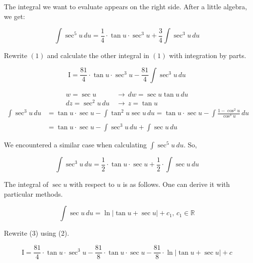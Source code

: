 \documentclass{article}
\begin{document}
\hfill

\noindent The integral we want to evaluate appears on the right side. After a little algebra, we get:

\begin{equation*}
\int\sec^5u \,du = \frac 14\cdot\tan u\cdot\sec^3 u + \frac 34\int\sec^3u\,du
\end{equation*}

\hfill

\noindent Rewrite $(1)$ and calculate the other integral in $(1)$ with integration by parts.

\begin{equation}
\mathrm{I} = \frac{81}4\cdot\tan u\cdot\sec^3 u - \frac {81}4\int\sec^3u\,du
\end{equation}

\begin{align*}
    w=\sec u\,&\rightarrow\, dw = \sec u\tan u \,du\\
    dz=\sec^2u\,du\,&\rightarrow\, z = \tan u
\end{align*}
\begin{align*}
\int\sec^3u\,du&=\tan u \cdot \sec u -\int \tan^2 u\sec u\, du = \tan u \cdot \sec u -\int \frac{1-\cos^2u}{\cos^3 u}\, du\\\\&= \tan u \cdot \sec u - \int \sec^3u \, du + \int \sec u \, du 
\end{align*}

\hfill

\noindent We encountered a similar case when calculating $\displaystyle \int\sec^5 u \, du$. So,

\begin{equation*}
\int\sec^3u\,du= \frac12\cdot\tan u \cdot\sec u + \frac12\cdot\int \sec u\,du
\end{equation*}

\hfill

\noindent The integral of $\sec u$ with respect to $u$ is as follows. One can derive it with particular methods.

\begin{equation}\int\sec u \, du = \ln|\tan u + \sec u| + c_1,\,c_1\in\mathbb{R}
\end{equation}

\hfill

\noindent Rewrite (3) using (2).

\begin{equation*}
\mathrm{I} = \frac{81}4\cdot\tan u\cdot\sec^3 u -\frac{81}{8} \cdot\tan u \cdot\sec u-\frac{81}{8}\cdot\ln|\tan u + \sec u| + c
\end{equation*}
\end{document}
